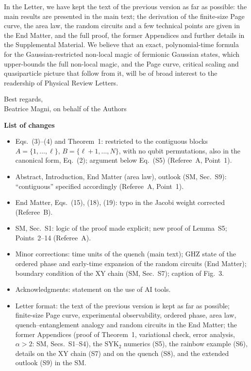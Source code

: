 \documentclass[11pt]{article}
\newcommand{\RENYI}{\alpha}
\begin{document}
\medskip
\noindent
In the Letter, we have kept the text of the previous version as far as possible: the main results are presented in the main text; the derivation of the finite-size Page curve, the area law, the random circuits and a few technical points are given in the End Matter, and the full proof, the former Appendices and further details in the Supplemental Material. We believe that an exact, polynomial-time formula for the Gaussian-restricted non-local magic of fermionic Gaussian states, which upper-bounds the full non-local magic, and the Page curve, critical scaling and quasiparticle picture that follow from it, will be of broad interest to the readership of Physical Review Letters.

\medskip
\noindent
Best regards,\\
Beatrice Magni, on behalf of the Authors

\newpage

\noindent\textbf{\large List of changes}

\medskip

\begin{itemize}[leftmargin=*]
\item Eqs.~(3)--(4) and Theorem~1: restricted to the contiguous blocks $A=\{1,\dots,\ell\}$, $B=\{\ell+1,\dots,N\}$, with no qubit permutations, also in the canonical form, Eq.~(2); argument below Eq.~(S5) (Referee~A, Point~1).
\item Abstract, Introduction, End Matter (area law), outlook (SM, Sec.~S9): ``contiguous'' specified accordingly (Referee~A, Point~1).
\item End Matter, Eqs.~(15), (18), (19): typo in the Jacobi weight corrected (Referee~B).
\item SM, Sec.~S1: logic of the proof made explicit; new proof of Lemma~S5; Points~2--14 (Referee~A).
\item Minor corrections: time units of the quench (main text); GHZ state of the ordered phase and early-time expansion of the random circuits (End Matter); boundary condition of the XY chain (SM, Sec.~S7); caption of Fig.~3.
\item Acknowledgments: statement on the use of AI tools.
\item Letter format: the text of the previous version is kept as far as possible; finite-size Page curve, experimental observability, ordered phase, area law, quench--entanglement analogy and random circuits in the End Matter; the former Appendices (proof of Theorem~1, variational check, error analysis, $\RENYI>2$: SM, Secs.~S1--S4), the SYK$_2$ numerics (S5), the rainbow example (S6), details on the XY chain (S7) and on the quench (S8), and the extended outlook (S9) in the SM.
\end{itemize}
\end{document}
